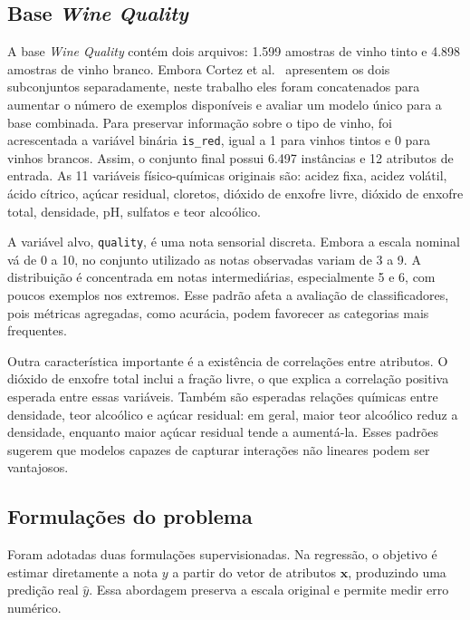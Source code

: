 \documentclass[12pt,a4paper]{article}
\begin{document}
\subsection{Base \textit{Wine Quality}}
\label{subsec:dataset}

A base \textit{Wine Quality} cont\'em dois arquivos: 1.599 amostras de vinho tinto e 4.898 amostras de vinho branco. Embora Cortez et al.~\cite{cortez2009modeling} apresentem os dois subconjuntos separadamente, neste trabalho eles foram concatenados para aumentar o n\'umero de exemplos dispon\'iveis e avaliar um modelo \'unico para a base combinada. Para preservar informa\c{c}\~ao sobre o tipo de vinho, foi acrescentada a vari\'avel bin\'aria \texttt{is\_red}, igual a 1 para vinhos tintos e 0 para vinhos brancos. Assim, o conjunto final possui 6.497 inst\^ancias e 12 atributos de entrada. As 11 vari\'aveis f\'isico-qu\'imicas originais s\~ao: acidez fixa, acidez vol\'atil, \'acido c\'itrico, a\c{c}\'ucar residual, cloretos, di\'oxido de enxofre livre, di\'oxido de enxofre total, densidade, pH, sulfatos e teor alco\'olico.

A vari\'avel alvo, \texttt{quality}, \'e uma nota sensorial discreta. Embora a escala nominal v\'a de 0 a 10, no conjunto utilizado as notas observadas variam de 3 a 9. A distribui\c{c}\~ao \'e concentrada em notas intermedi\'arias, especialmente 5 e 6, com poucos exemplos nos extremos. Esse padr\~ao afeta a avalia\c{c}\~ao de classificadores, pois m\'etricas agregadas, como acur\'acia, podem favorecer as categorias mais frequentes.

Outra caracter\'istica importante \'e a exist\^encia de correla\c{c}\~oes entre atributos. O di\'oxido de enxofre total inclui a fra\c{c}\~ao livre, o que explica a correla\c{c}\~ao positiva esperada entre essas vari\'aveis. Tamb\'em s\~ao esperadas rela\c{c}\~oes qu\'imicas entre densidade, teor alco\'olico e a\c{c}\'ucar residual: em geral, maior teor alco\'olico reduz a densidade, enquanto maior a\c{c}\'ucar residual tende a aument\'a-la. Esses padr\~oes sugerem que modelos capazes de capturar intera\c{c}\~oes n\~ao lineares podem ser vantajosos.

\subsection{Formula\c{c}\~oes do problema}
\label{subsec:formulacoes}

Foram adotadas duas formula\c{c}\~oes supervisionadas. Na regress\~ao, o objetivo \'e estimar diretamente a nota $y$ a partir do vetor de atributos $\mathbf{x}$, produzindo uma predi\c{c}\~ao real $\hat{y}$. Essa abordagem preserva a escala original e permite medir erro num\'erico.
\end{document}
